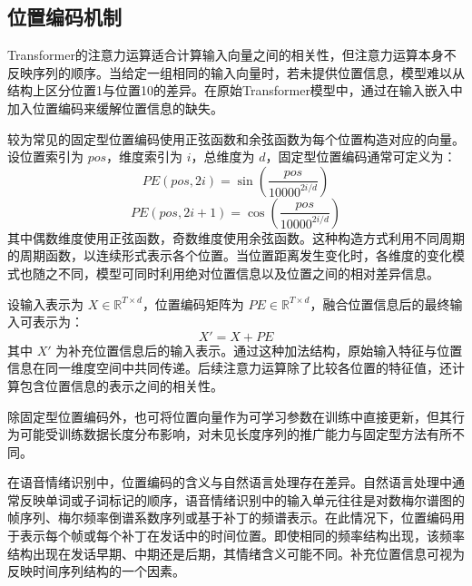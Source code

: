 \subsection{位置编码机制}

Transformer的注意力运算适合计算输入向量之间的相关性，但注意力运算本身不反映序列的顺序。当给定一组相同的输入向量时，若未提供位置信息，模型难以从结构上区分位置1与位置10的差异。在原始Transformer模型中，通过在输入嵌入中加入位置编码来缓解位置信息的缺失\cite{vaswani2017attention}。

较为常见的固定型位置编码使用正弦函数和余弦函数为每个位置构造对应的向量。设位置索引为 $pos$，维度索引为 $i$，总维度为 $d$，固定型位置编码通常可定义为\cite{vaswani2017attention}：
\begin{equation}
PE(pos,2i)=\sin\left(\frac{pos}{10000^{2i/d}}\right)
\label{eq:pe_sin}
\end{equation}
\begin{equation}
PE(pos,2i+1)=\cos\left(\frac{pos}{10000^{2i/d}}\right)
\label{eq:pe_cos}
\end{equation}
其中偶数维度使用正弦函数，奇数维度使用余弦函数。这种构造方式利用不同周期的周期函数，以连续形式表示各个位置。当位置距离发生变化时，各维度的变化模式也随之不同，模型可同时利用绝对位置信息以及位置之间的相对差异信息\cite{vaswani2017attention}。

设输入表示为 $X \in \mathbb{R}^{T \times d}$，位置编码矩阵为 $PE \in \mathbb{R}^{T \times d}$，融合位置信息后的最终输入可表示为：
\begin{equation}
X' = X + PE
\label{eq:pe_add}
\end{equation}
其中 $X'$ 为补充位置信息后的输入表示。通过这种加法结构，原始输入特征与位置信息在同一维度空间中共同传递。后续注意力运算除了比较各位置的特征值，还计算包含位置信息的表示之间的相关性\cite{vaswani2017attention}。


除固定型位置编码外，也可将位置向量作为可学习参数在训练中直接更新，但其行为可能受训练数据长度分布影响，对未见长度序列的推广能力与固定型方法有所不同\cite{vaswani2017attention}。

在语音情绪识别中，位置编码的含义与自然语言处理存在差异。自然语言处理中通常反映单词或子词标记的顺序，语音情绪识别中的输入单元往往是对数梅尔谱图的帧序列、梅尔频率倒谱系数序列或基于补丁的频谱表示\cite{chen2023dwformer,wang2024swin,ahn2025multitask}。在此情况下，位置编码用于表示每个帧或每个补丁在发话中的时间位置。即使相同的频率结构出现，该频率结构出现在发话早期、中期还是后期，其情绪含义可能不同。补充位置信息可视为反映时间序列结构的一个因素。



